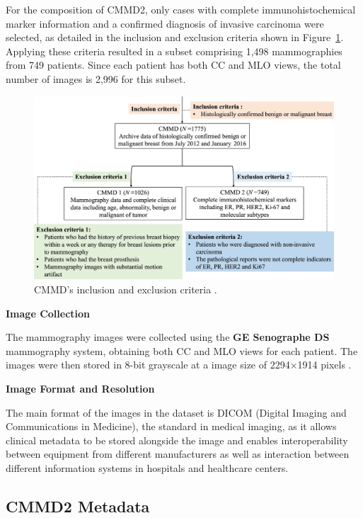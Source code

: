 \documentclass[a4paper,10pt]{book}
\begin{document}
For the composition of CMMD2, only cases with complete immunohistochemical marker information and a confirmed diagnosis of invasive carcinoma were selected, as detailed in the inclusion and exclusion criteria shown in Figure~\ref{fig:cmmd_criteria}. Applying these criteria resulted in a subset comprising 1,498 mammographies from 749 patients. Since each patient has both CC and MLO views, the total number of images is 2,996 for this subset.

\begin{figure}[h!]
	\centering
	\includegraphics[width=0.85\linewidth]{reports//assets/cmmd_criteria.png}
	\caption[CMMD's inclusion and exclusion criteria]{CMMD's inclusion and exclusion criteria \cite{cai_online_2023}.}
	\label{fig:cmmd_criteria}
\end{figure}

\textbf{Image Collection}

The mammography images were collected using the \textbf{GE Senographe DS} mammography system, obtaining both CC and MLO views for each patient. The images were then stored in 8-bit grayscale at a image size of 2294×1914 pixels \cite{cai_online_2023}.

\textbf{Image Format and Resolution}

The main format of the images in the dataset is DICOM (Digital Imaging and Communications in Medicine), the standard in medical imaging, as it allows clinical metadata to be stored alongside the image and enables interoperability between equipment from different manufacturers as well as interaction between different information systems in hospitals and healthcare centers.

\subsection{CMMD2 Metadata}
\end{document}
